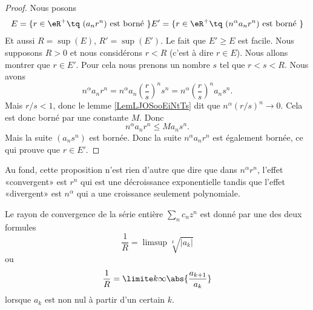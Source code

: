 \begin{proof}
    Nous posons
    \begin{subequations}
        \begin{align}
            E=\{ r\in \eR^+\tq \text{  } (a_nr^n)\text{ est borné } \}
            E'=\{ r\in \eR^+\tq \text{  } (n^{\alpha}a_nr^n)\text{ est borné } \}
        \end{align}
    \end{subequations}
    Et aussi \( R=\sup(E)\), \( R'=\sup(E')\). Le fait que \( E'\geq E\) est facile. Nous supposons \( R>0\) et nous considérons \( r<R\) (c'est à dire \( r\in E\)).  Nous allons montrer que \( r\in E'\). Pour cela nous prenons un nombre \( s\) tel que \( r<s<R\). Nous avons
    \begin{equation}
        n^{\alpha}a_nr^n=n^{\alpha}a_n\left( \frac{ r }{ s } \right)^ns^n=n^{\alpha}\left( \frac{ r }{ s } \right)^na_ns^n.
    \end{equation}
    Mais \( r/s<1\), donc le lemme \ref{LemLJOSooEiNtTs} dit que \( n^{\alpha}(r/s)^n\to 0\). Cela est donc borné par une constante \( M\). Donc
    \begin{equation}
        n^{\alpha}a_nr^n\leq Ma_ns^n.
    \end{equation}
    Mais la suite \( (a_ns^n)\) est bornée. Donc la suite \( n^{\alpha}a_nr^n\) est également bornée, ce qui prouve que \( r\in E'\).
\end{proof}

\begin{remark}
    Au fond, cette proposition n'est rien d'autre que dire que dans \( n^\alpha r^n\), l'effet «convergent» est \( r^n\) qui est une décroissance exponentielle tandis que l'effet «divergent» est \( n^{\alpha}\) qui a une croissance seulement polynomiale.

\end{remark}

\begin{theorem}		\label{ThoSerPuissRap}
Le rayon de convergence de la série entière \( \sum_n c_n z^n\) est donné par une des deux formules
\begin{equation}		\label{EqRayCOnvSer}
	\frac{1}{ R } =\limsup\sqrt[k]{| a_k |}
\end{equation}
ou
\begin{equation}		\label{EqAlphaSerPuissAtern}
	\frac{1}{ R }=\limite k \infty \abs{\frac{a_{k+1}}{a_k}}
\end{equation}
lorsque $a_k$ est non nul à partir d'un certain $k$.
\end{theorem}

